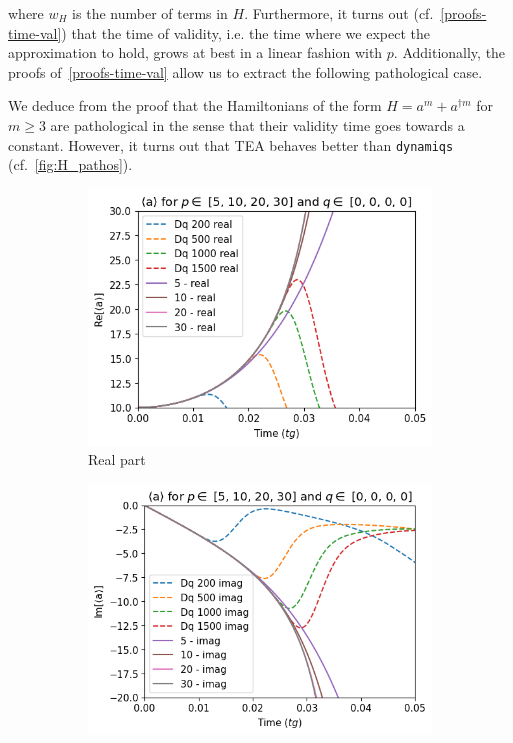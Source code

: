 where $w_H$ is the number of terms in $H$. Furthermore, it turns out (cf.\@~\autoref{proofs-time-val}) that the time of validity, i.e. the time where we expect the approximation to hold, grows at best in a linear fashion with $p$. Additionally, the proofs of~\autoref{proofs-time-val} allow us to extract the following pathological case.
\begin{corollary}
    We deduce from the proof that the Hamiltonians of the form $H = a^m + a^{\dagger m}$ for $m \ge 3$ are pathological in the sense that their validity time goes towards a constant. However, it turns out that TEA behaves better than \texttt{dynamiqs} \cite{dynamiqs} (cf.\@~\autoref{fig:H_pathos}).
\end{corollary}
\begin{figure}[h!]
    \centering
    \begin{subfigure}{0.49\linewidth}
        \centering
        \includegraphics[width=\linewidth]{Pics/Re_H_pathos.pdf}
        \caption{Real part}
        \label{fig:Re_H_pathos}
    \end{subfigure}
    \hfill
    \begin{subfigure}{0.49\linewidth}
        \centering
        \includegraphics[width=\linewidth]{Pics/Im_H_pathos.pdf}

\end{subfigure}
\end{figure}
